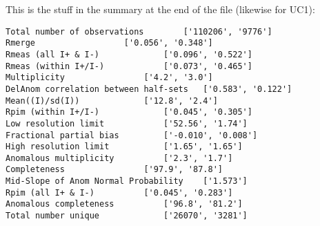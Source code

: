 \documentclass[a4paper, 11pt]{article}
\begin{document}
This is the stuff in the summary at the end of the file (likewise for UC1):

{
\tiny
\begin{verbatim}
Total number of observations    	['110206', '9776']
Rmerge 					['0.056', '0.348']
Rmeas (all I+ & I-) 			['0.096', '0.522']
Rmeas (within I+/I-) 			['0.073', '0.465']
Multiplicity 				['4.2', '3.0']
DelAnom correlation between half-sets 	['0.583', '0.122']
Mean((I)/sd(I)) 			['12.8', '2.4']
Rpim (within I+/I-) 			['0.045', '0.305']
Low resolution limit 			['52.56', '1.74']
Fractional partial bias 		['-0.010', '0.008']
High resolution limit 			['1.65', '1.65']
Anomalous multiplicity 			['2.3', '1.7']
Completeness 				['97.9', '87.8']
Mid-Slope of Anom Normal Probability 	['1.573']
Rpim (all I+ & I-) 			['0.045', '0.283']
Anomalous completeness 			['96.8', '81.2']
Total number unique 			['26070', '3281']
\end{verbatim}
}
\end{document}
